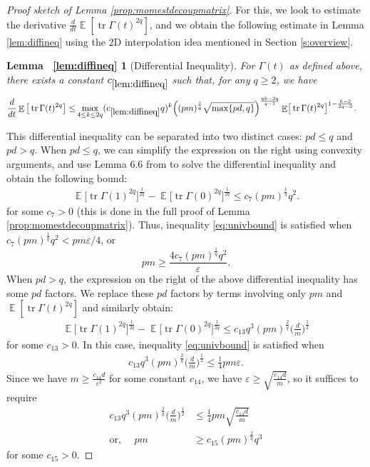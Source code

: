 \documentclass[11pt]{amsart}
\numberwithin{equation}{section}
\numberwithin{equation}{section}
\DeclareMathOperator{\E}{\mathbb{E}}
\DeclareMathOperator*{\tr}{tr}
\newtheorem*{diffineqlemma}{Lemma ~\ref{lem:diffineq}}
\theoremstyle{remark}
\theoremstyle{definition}
\begin{document}
\begin{proof}[Proof sketch of Lemma \ref{prop:momestdecoupmatrix}]
For this, we look to estimate the derivative $\frac{d}{dt} \E[\tr \Gamma(t)^{2q}]$, and we obtain the following estimate in Lemma \ref{lem:diffineq} using the 2D interpolation idea mentioned in Section \ref{s:overview}.
\begin{diffineqlemma}[Differential Inequality]
For $\Gamma(t)$ as defined above, there exists a constant $c_{\ref*{lem:diffineq}}$ such that, for any $q \ge 2$, we have
\begin{align*}
\frac{d}{dt} \E\big[\tr \Gamma(t)^{2q}\big] \le& \max \limits_{4 \le k \le 2q} (c_{\ref*{lem:diffineq}}q)^k \Big((pm)^{\frac{1}{q}}\sqrt{\max\{pd,q\}}\Big)^{\frac{qk-2q}{q-1}}\E\!\big[\tr \Gamma(t)^{2q}\big]^{1-\frac{k-2}{2q-2}}.
\end{align*}
\end{diffineqlemma}
This differential inequality can be separated into two distinct cases: $pd \le q$ and $pd>q$. When $pd\leq q$, we can simplify the expression on the right using convexity arguments, and use Lemma 6.6 from \cite{brailovskaya2022universality} to solve the differential inequality and obtain the following bound:
\begin{align*}
    \E\!\big[\tr \Gamma(1)^{2q}\big]^{\frac{1}{2q}}-\E\!\big[\tr \Gamma(0)^{2q}\big]^{\frac{1}{2q}} \le c_7 (pm)^{\frac{1}{q}} q^2.
\end{align*}
for some $c_7>0$ (this is done in the full proof of Lemma \ref{prop:momestdecoupmatrix}). Thus, inequality \eqref{eq:univbound} is satisfied when $c_7(pm)^{\frac{1}{q}} q^2 < pm \varepsilon/4$, or
\[ pm \ge \frac{4c_7(pm)^{\frac{1}{q}} q^2}{\varepsilon}. \]
When $pd>q$, the expression on the right of the above differential inequality has some $pd$ factors. We replace these $pd$ factors by terms involving only $pm$ and $\E[\tr \Gamma(t)^{2q}]$ and similarly obtain:
\begin{align*}
    \E\!\big[\tr \Gamma(1)^{2q}\big]^{\frac{1}{2q}}-\E\!\big[\tr \Gamma(0)^{2q}\big]^{\frac{1}{2q}} \le c_{13}  q^3 (pm)^{\frac{2}{q}} \Big(\frac{d}{m}\Big)^{\frac{1}{2}}
\end{align*}
for some $c_{13}>0$. In this case, inequality \eqref{eq:univbound} is satisfied when 
\begin{align*}
    c_{13} q^3 (pm)^{\frac{2}{q}}\Big(\frac{d}{m}\Big)^{\frac{1}{2}} \le \frac{1}{4} pm \varepsilon.
\end{align*}
Since we have $m \ge \frac{c_{14}d}{\varepsilon^2}$ for some constant $c_{14}$, we have $\varepsilon \ge \sqrt{\frac{c_{14}d}{m}}$, so it suffices to require
\begin{align*}
    c_{13} q^3 (pm)^{\frac{2}{q}}\Big(\frac{d}{m}\Big)^{\frac{1}{2}} &\le \frac{1}{4}pm \sqrt{\frac{c_{14}d}{m}} \\
     \text{or, }\quad pm &\ge c_{15} (pm)^{\frac{2}{q}} {q^3}
\end{align*}
for some $c_{15}>0$.


\end{proof}
\end{document}
